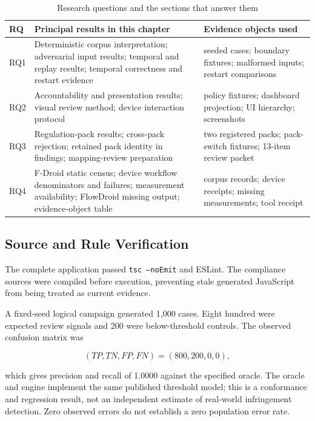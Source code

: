 \begin{table}[H]
\centering
\caption{Research questions and the sections that answer them}
\label{tab:rq-result-map}
\scriptsize
\setlength{\tabcolsep}{4pt}
\begin{tabular}{>{\raggedright\arraybackslash}p{}>{\raggedright\arraybackslash}p{}>{\raggedright\arraybackslash}p{}}
\toprule
RQ & Principal results in this chapter & Evidence objects used \\
\midrule
RQ1 & Deterministic corpus interpretation; adversarial input results; temporal and replay results; temporal correctness and restart evidence & seeded cases; boundary fixtures; malformed inputs; restart comparisons \\
RQ2 & Accountability and presentation results; visual review method; device interaction protocol & policy fixtures; dashboard projection; UI hierarchy; screenshots \\
RQ3 & Regulation-pack results; cross-pack rejection; retained pack identity in findings; mapping-review preparation & two registered packs; pack-switch fixtures; 13-item review packet \\
RQ4 & F-Droid static census; device workflow denominators and failures; measurement availability; FlowDroid missing output; evidence-object table & corpus records; device receipts; missing measurements; tool receipt \\
\bottomrule
\end{tabular}
\end{table}

\subsection{Source and Rule Verification}

The complete application passed \texttt{tsc --noEmit} and ESLint. The compliance sources were compiled before execution, preventing stale generated JavaScript from being treated as current evidence.

A fixed-seed logical campaign generated 1,000 cases. Eight hundred were expected review signals and 200 were below-threshold controls. The observed confusion matrix was

\begin{equation}
(TP,TN,FP,FN)=(800,200,0,0),
\end{equation}

which gives precision and recall of 1.0000 against the specified oracle. The oracle and engine implement the same published threshold model; this is a conformance and regression result, not an independent estimate of real-world infringement detection. Zero observed errors do not establish a zero population error rate.

